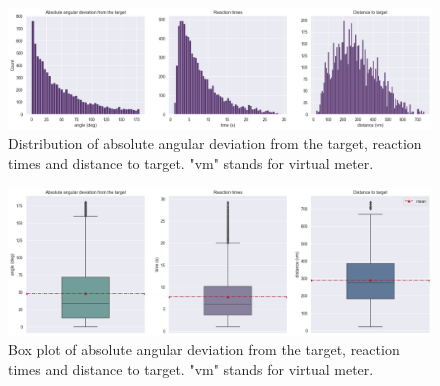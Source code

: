 \shipout\null

\begin{figure}[!htb]
	\centering
	\includegraphics[width=160mm]{figures/ard_hist.png}
	\caption[Distribution of absolute angular deviation from the target, reaction times and distance to target]{Distribution of absolute angular deviation from the target, reaction times and distance to target. "vm" stands for virtual meter.}
	\label{fig:ard_hist}
\end{figure}

\begin{figure}[!htb]
	\centering
	\includegraphics[width=160mm]{figures/ard_box.png}
	\caption[Box plot of absolute angular deviation from the target, reaction times and distance to target]{Box plot of absolute angular deviation from the target, reaction times and distance to target. "vm" stands for virtual meter.}
	\label{fig:ard_box}
\end{figure}


